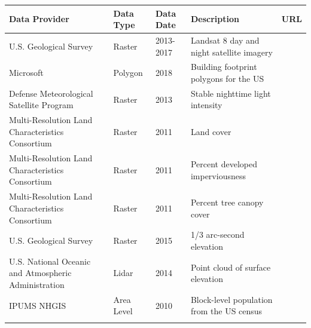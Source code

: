 \documentclass[final,3p,times,twocolumn,sort&compress]{elsarticle}
\begin{document}
\begin{tabu}to \textwidth{ X[l]  X[c]  X[c] X[l] X[l] }
 \hline
 Data Provider & Data Type & Data Date & Description & URL \\
 \hline
U.S. Geological Survey  & Raster  & 2013-2017 &
    Landsat 8 day and night satellite imagery &  \\
Microsoft  & Polygon  & 2018 & Building footprint polygons for the US &
     \\
Defense Meteorological Satellite Program  & Raster  & 2013 &
    Stable nighttime light intensity &  \\
Multi-Resolution Land Characteristics Consortium  & Raster  & 2011 &
    Land cover &  \\
Multi-Resolution Land Characteristics Consortium  & Raster  & 2011 &
    Percent developed imperviousness &  \\
Multi-Resolution Land Characteristics Consortium  & Raster  & 2011 &
    Percent tree canopy cover &  \\
U.S. Geological Survey  & Raster  & 2015 & 1/3 arc-second elevation &
     \\
U.S. National Oceanic and Atmospheric Administration  & Lidar  & 2014 & Point cloud of surface elevation &
     \\
IPUMS NHGIS  & Area Level  & 2010 &
    Block-level population from the US census & \cite{nhgis}\\
\hline
\label{tab:data}
\end{tabu}


\newpage
\end{document}
